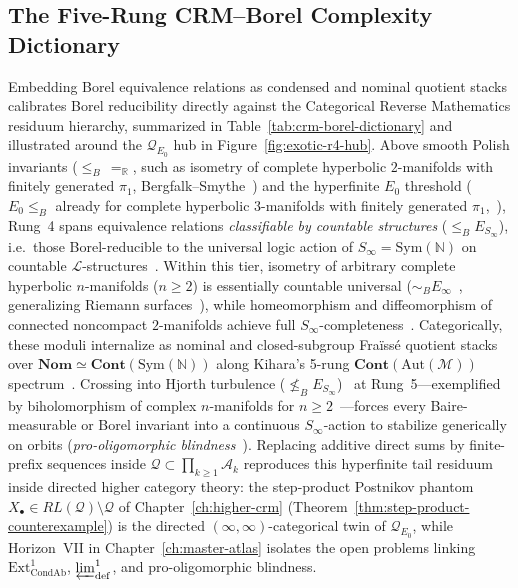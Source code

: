 \subsection{The Five-Rung CRM--Borel Complexity Dictionary}

Embedding Borel equivalence relations as condensed and nominal quotient stacks calibrates Borel reducibility directly against the Categorical Reverse Mathematics residuum hierarchy, summarized in Table~\ref{tab:crm-borel-dictionary} and illustrated around the $\mathcal{Q}_{E_0}$ hub in Figure~\ref{fig:exotic-r4-hub}. Above smooth Polish invariants ($\le_B\, =_{\mathbb{R}}$, such as isometry of complete hyperbolic $2$-manifolds with finitely generated $\pi_1$, Bergfalk--Smythe~\cite[Theorem~B]{BergfalkSmythe25}) and the hyperfinite $E_0$ threshold ($E_0 \le_B$ already for complete hyperbolic $3$-manifolds with finitely generated $\pi_1$,~\cite[Theorem~C]{BergfalkSmythe25}), Rung~4 spans equivalence relations \emph{classifiable by countable structures} ($\le_B E_{S_\infty}$), i.e.\ those Borel-reducible to the universal logic action of $S_\infty = \mathrm{Sym}(\mathbb{N})$ on countable $\mathcal{L}$-structures~\cite[\S2.7]{BeckerKechris96}. Within this tier, isometry of arbitrary complete hyperbolic $n$-manifolds ($n \ge 2$) is essentially countable universal ($\sim_B E_\infty$~\cite[Theorem~D]{BergfalkSmythe25}, generalizing Riemann surfaces~\cite{HjorthKechris00}), while homeomorphism and diffeomorphism of connected noncompact $2$-manifolds achieve full $S_\infty$-completeness~\cite[Theorem~E]{BergfalkSmythe25}. Categorically, these moduli internalize as nominal and closed-subgroup Fra\"iss\'e quotient stacks over $\mathbf{Nom} \simeq \mathbf{Cont}(\mathrm{Sym}(\mathbb{N}))$ along Kihara's 5-rung $\mathbf{Cont}(\mathrm{Aut}(\mathcal{M}))$ spectrum~\cite{Kihara26}. Crossing into Hjorth turbulence ($\not\le_B E_{S_\infty}$)~\cite[Ch.~3, Theorem~3.21]{Hjorth00} at Rung~5---exemplified by biholomorphism of complex $n$-manifolds for $n \ge 2$~\cite{HjorthKechris00}---forces every Baire-measurable or Borel invariant into a continuous $S_\infty$-action to stabilize generically on orbits (\emph{pro-oligomorphic blindness}~\cite{Hjorth00,Kihara26}). Replacing additive direct sums by finite-prefix sequences inside $\mathcal{Q} \subset \prod_{k \ge 1} \mathcal{A}_k$ reproduces this hyperfinite tail residuum inside directed higher category theory: the step-product Postnikov phantom $X_\bullet \in RL(\mathcal{Q}) \setminus \mathcal{Q}$ of Chapter~\ref{ch:higher-crm} (Theorem~\ref{thm:step-product-counterexample}) is the directed $(\infty,\infty)$-categorical twin of $\mathcal{Q}_{E_0}$, while Horizon~VII in Chapter~\ref{ch:master-atlas} isolates the open problems linking $\mathrm{Ext}^1_{\mathrm{CondAb}}$, $\varprojlim^1_{\mathrm{def}}$, and pro-oligomorphic blindness.

